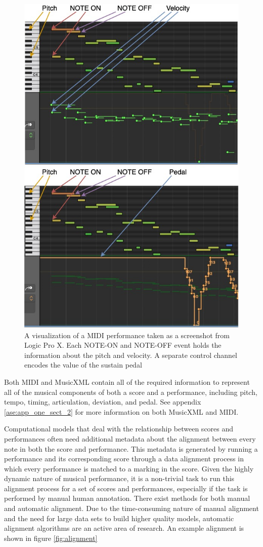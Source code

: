 \begin{figure}
    \centering
    \includegraphics[width=0.7\linewidth]{figs/ch2/midi.jpg}
    \caption{A visualization of a MIDI performance taken as a screenshot from Logic Pro X. Each NOTE-ON and NOTE-OFF event holds the information about the pitch and velocity. A separate control channel encodes the value of the sustain pedal}
    \label{fig:midi}
\end{figure}

Both MIDI and MusicXML contain all of the required information to represent all of the musical components of both a score and a performance, including pitch, tempo, timing, articulation, deviation, and pedal. See appendix \ref{ase:app_one_sect_2} for more information on both MusicXML and MIDI. 

Computational models that deal with the relationship between scores and performances often need additional metadata about the alignment between every note in both the score and performance. This metadata is generated by running a performance and its corresponding score through a data alignment process in which every performance is matched to a marking in the score. Given the highly dynamic nature of musical performance, it is a non-trivial task to run this alignment process for a set of scores and performances, especially if the task is performed by manual human annotation. There exist methods for both manual and automatic alignment. Due to the time-consuming nature of manual alignment and the need for large data sets to build higher quality models, automatic alignment algorithms are an active area of research. An example alignment is shown in figure \ref{fig:alignment}


